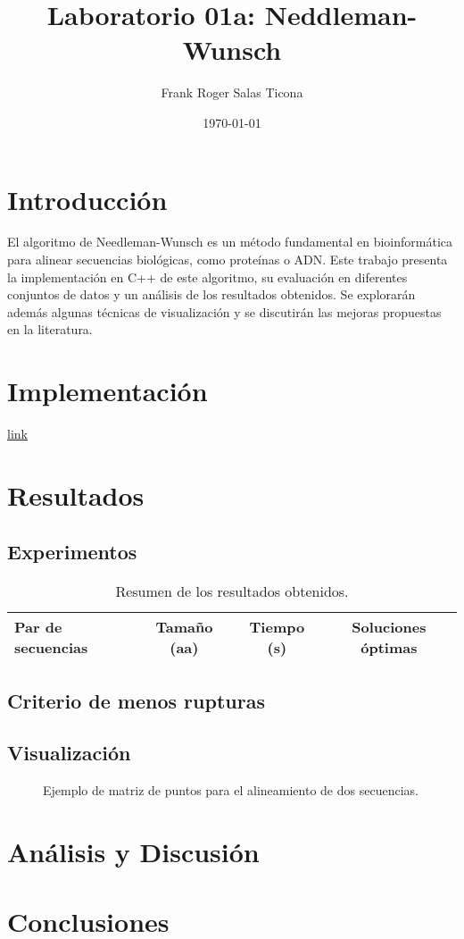 \documentclass{article}
\title{Laboratorio 01a: Neddleman-Wunsch}
\author{Frank Roger Salas Ticona}
\date{\today}
\begin{document}
\maketitle

\section{Introducción}
El algoritmo de Needleman-Wunsch es un método fundamental en bioinformática para alinear secuencias biológicas, como proteínas o ADN. Este trabajo presenta la implementación en C++ de este algoritmo, su evaluación en diferentes conjuntos de datos y un análisis de los resultados obtenidos. Se explorarán además algunas técnicas de visualización y se discutirán las mejoras propuestas en la literatura.

\section{Implementación}
\href{https://github.com/DaereanLegrand/Neddleman-Wunsch.git}{link}

\section{Resultados}
\subsection{Experimentos}

\begin{table}[ht]
    \centering
    \begin{tabular}{|l|c|c|c|}
        \hline
        Par de secuencias & Tamaño (aa) & Tiempo (s) & Soluciones óptimas \\
        \hline
    \end{tabular}
    \caption{Resumen de los resultados obtenidos.}
    \label{tab:resultados}
\end{table}

\subsection{Criterio de menos rupturas}

\subsection{Visualización}
\begin{figure}[ht]
    \centering
    \caption{Ejemplo de matriz de puntos para el alineamiento de dos secuencias.}
    \label{fig:matriz_puntos}
\end{figure}

\section{Análisis y Discusión}

\section{Conclusiones}



\end{document}
